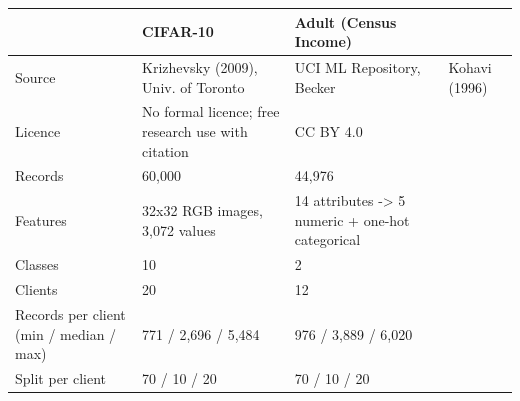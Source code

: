\begin{tabular}{p{2.3cm}p{2.6cm}p{2.6cm}}
\toprule
 & CIFAR-10 & Adult (Census Income) \\
\midrule
Source & Krizhevsky (2009), Univ. of Toronto & UCI ML Repository, Becker & Kohavi (1996) \\
Licence & No formal licence; free research use with citation & CC BY 4.0 \\
Records & 60,000 & 44,976 \\
Features & 32x32 RGB images, 3,072 values & 14 attributes -> 5 numeric + one-hot categorical \\
Classes & 10 & 2 \\
Clients & 20 & 12 \\
Records per client (min / median / max) & 771 / 2,696 / 5,484 & 976 / 3,889 / 6,020 \\
Split per client & 70 / 10 / 20 & 70 / 10 / 20 \\
\bottomrule
\end{tabular}
